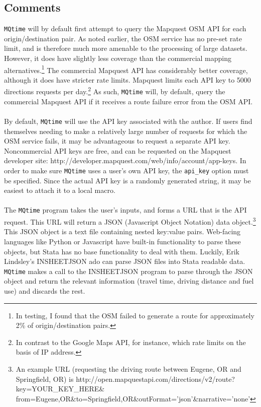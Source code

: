 \documentclass[12pt]{article}
\begin{document}
\subsection{Comments}
\verb|MQtime| will by default first attempt to query the Mapquest OSM API for each origin/destination pair. As noted earlier, the OSM service has no pre-set rate limit, and is therefore much more amenable to the processing of large datasets. However, it does have slightly less coverage than the commercial mapping alternatives.\footnote{In testing, I found that the OSM failed to generate a route for approximately 2\% of origin/destination pairs.} The commercial Mapquest API has considerably better coverage, although it does have stricter rate limits. Mapquest limits each API key to 5000 directions requests per day.\footnote{In contrast to the Google Maps API, for instance, which rate limits on the basis of IP address.} As such, \verb|MQtime| will, by default, query the commercial Mapquest API if it receives a route failure error from the OSM API. 
\\ \\
By default, \verb|MQtime| will use the API key associated with the author. If users find themselves needing to make a relatively large number of requests for which the OSM service fails, it may be advantageous to request a separate API key. Noncommercial API keys are free, and can be requested on the Mapquest developer site: http://developer.mapquest.com/web/info/account/app-keys. In order to make sure \verb|MQtime| uses a user's own API key, the \verb|api_key| option must be specified. Since the actual API key is a randomly generated string, it may be easiest to attach it to a local macro.
\\ \\
The \verb|MQtime| program takes the user's inputs, and forms a URL that is the API request. This URL will return a JSON (Javascript Object Notation) data object.\footnote{An example URL (requesting the driving route between Eugene, OR and Springfield, OR) is http://open.mapquestapi.com/directions/v2/route?key=YOUR\_KEY\_HERE\& from=Eugene,OR\&to=Springfield,OR\&outFormat='json'\&narrative='none'} This JSON object is a text file containing nested key:value pairs. Web-facing languages like Python or Javascript have built-in functionality to parse these objects, but Stata has no base functionality to deal with them. Luckily, Erik Lindsley's INSHEETJSON ado can parse JSON files into Stata readable data. \verb|MQtime| makes a call to the INSHEETJSON program to parse through the JSON object and return the relevant information (travel time, driving distance and fuel use) and discards the rest.
\end{document}
